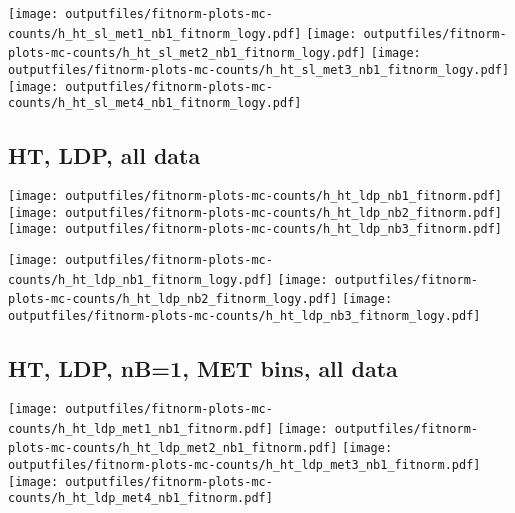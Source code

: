 \documentclass[11pt]{article}
\begin{document}
    \noindent
     \texttt{[image: outputfiles/fitnorm-plots-mc-counts/h\_ht\_sl\_met1\_nb1\_fitnorm\_logy.pdf]}
     \texttt{[image: outputfiles/fitnorm-plots-mc-counts/h\_ht\_sl\_met2\_nb1\_fitnorm\_logy.pdf]}
     \texttt{[image: outputfiles/fitnorm-plots-mc-counts/h\_ht\_sl\_met3\_nb1\_fitnorm\_logy.pdf]}
     \texttt{[image: outputfiles/fitnorm-plots-mc-counts/h\_ht\_sl\_met4\_nb1\_fitnorm\_logy.pdf]}

   \clearpage














    \subsection{ HT, LDP, all data}

    \noindent
     \texttt{[image: outputfiles/fitnorm-plots-mc-counts/h\_ht\_ldp\_nb1\_fitnorm.pdf]}
     \texttt{[image: outputfiles/fitnorm-plots-mc-counts/h\_ht\_ldp\_nb2\_fitnorm.pdf]}
     \texttt{[image: outputfiles/fitnorm-plots-mc-counts/h\_ht\_ldp\_nb3\_fitnorm.pdf]}

    \noindent
     \texttt{[image: outputfiles/fitnorm-plots-mc-counts/h\_ht\_ldp\_nb1\_fitnorm\_logy.pdf]}
     \texttt{[image: outputfiles/fitnorm-plots-mc-counts/h\_ht\_ldp\_nb2\_fitnorm\_logy.pdf]}
     \texttt{[image: outputfiles/fitnorm-plots-mc-counts/h\_ht\_ldp\_nb3\_fitnorm\_logy.pdf]}

     \subsection{ HT, LDP, nB=1, MET bins, all data}

    \noindent
     \texttt{[image: outputfiles/fitnorm-plots-mc-counts/h\_ht\_ldp\_met1\_nb1\_fitnorm.pdf]}
     \texttt{[image: outputfiles/fitnorm-plots-mc-counts/h\_ht\_ldp\_met2\_nb1\_fitnorm.pdf]}
     \texttt{[image: outputfiles/fitnorm-plots-mc-counts/h\_ht\_ldp\_met3\_nb1\_fitnorm.pdf]}
     \texttt{[image: outputfiles/fitnorm-plots-mc-counts/h\_ht\_ldp\_met4\_nb1\_fitnorm.pdf]}
\end{document}
